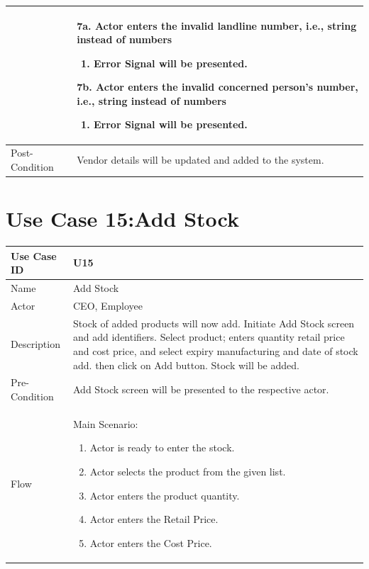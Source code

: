 \documentclass[12pt,a4paper]{report}
\begin{document}
\begin{tabular}{ | m{3cm} | m{12cm}| } \hline
& 7a. Actor enters the invalid landline number, i.e., string instead of numbers
	\begin{enumerate}
		\item Error Signal will be presented.
	\end{enumerate}
7b. Actor enters the invalid concerned person's number, i.e., string instead of numbers
	\begin{enumerate}
		\item Error Signal will be presented.
	\end{enumerate}
\\ \hline
Post-Condition &  Vendor details will be updated and added to the system. \\ \hline

\end{tabular}

\section{Use Case 15:Add Stock}

\begin{tabular}{ | m{3cm} | m{12cm}| } \hline

Use Case ID &  U15 \\\hline

Name  	    &  Add Stock \\ \hline

Actor     	& CEO, Employee \\ \hline

Description &  Stock of added products will now add. Initiate Add Stock screen and add identifiers. Select product; enters quantity retail price and cost price, and select expiry manufacturing and date of stock add. then click on Add button. Stock will be added.\\ \hline

Pre-Condition &  Add Stock screen will be presented to the respective actor. \\ \hline

Flow & Main Scenario:

\begin{enumerate}

\item Actor is ready to enter the stock.
\item Actor selects the product from the given list.
\item Actor enters the product quantity.
\item Actor enters the Retail Price.
\item Actor enters the Cost Price.
\end{enumerate}
\\ \hline
\end{tabular}
\end{document}
